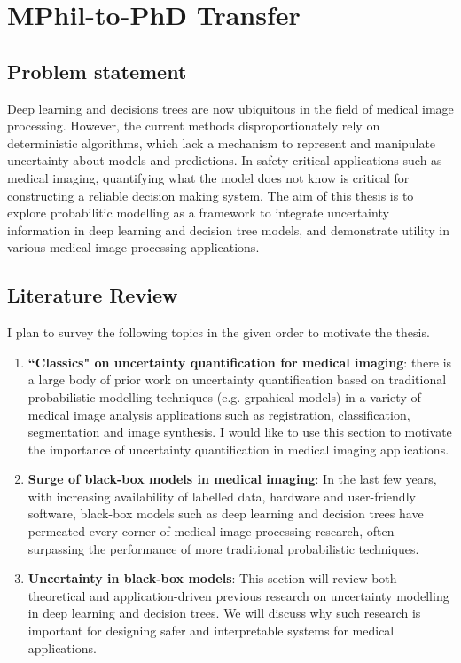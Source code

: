 \chapter*{MPhil-to-PhD Transfer}
\thispagestyle{empty}

\section*{Problem statement}
Deep learning and decisions trees are now ubiquitous in the field of medical image processing. However, the current methods disproportionately rely on deterministic algorithms, which lack a mechanism to represent and manipulate uncertainty about models and predictions. In safety-critical applications such as medical imaging, quantifying what the model does not know is critical for constructing a reliable decision making system. The aim of this thesis is to explore probabilitic modelling as a framework to integrate uncertainty information in deep learning and decision tree models, and demonstrate utility in various medical image processing applications. 


\section*{Literature Review} 

I plan to survey the following topics in the given order to motivate the thesis. 

\begin{enumerate}
	\item \textbf{``Classics" on uncertainty quantification for medical imaging}: there is a large body of prior work on uncertainty quantification based on traditional probabilistic modelling techniques (e.g. grpahical models) in a variety of medical image analysis applications such as registration, classification, segmentation and image synthesis. I would like to use this section to motivate the importance of uncertainty quantification in medical imaging applications. 

	\item \textbf{Surge of black-box models in medical imaging}: In the last few years, with increasing availability of labelled data, hardware and user-friendly software, black-box models such as deep learning and decision trees have permeated every corner of medical image processing research, often surpassing the performance of more traditional probabilistic techniques. 
	
	\item \textbf{Uncertainty in black-box models}: This section will review both theoretical and application-driven previous research on uncertainty modelling in deep learning and decision trees. We will discuss why such research is important for designing safer and interpretable systems for medical applications. 
\end{enumerate}


